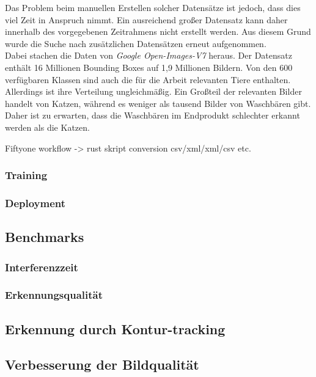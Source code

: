 Das Problem beim manuellen Erstellen solcher Datensätze ist jedoch, dass dies viel Zeit in Anspruch nimmt. Ein ausreichend großer Datensatz kann daher innerhalb des vorgegebenen Zeitrahmens nicht erstellt werden. Aus diesem Grund wurde die Suche nach zusätzlichen Datensätzen erneut aufgenommen.
\\
Dabei stachen die Daten von \textit{Google Open-Images-V7} heraus. Der Datensatz enthält 16 Millionen Bounding Boxes auf 1,9 Millionen Bildern. Von den 600 verfügbaren Klassen sind auch die für die Arbeit relevanten Tiere enthalten. Allerdings ist ihre Verteilung ungleichmäßig. Ein Großteil der relevanten Bilder handelt von Katzen, während es weniger als tausend Bilder von Waschbären gibt. Daher ist zu erwarten, dass die Waschbären im Endprodukt schlechter erkannt werden als die Katzen. \cite{google_oi7}

Fiftyone workflow -> rust skript conversion csv/xml/xml/csv etc.

\subsubsection{Training}

\subsubsection{Deployment}

\subsection{Benchmarks} \label{cap:Benchmarks}

\subsubsection{Interferenzzeit}

\subsubsection{Erkennungsqualität}

\subsection{Erkennung durch Kontur-tracking}

\subsection{Verbesserung der Bildqualität}

